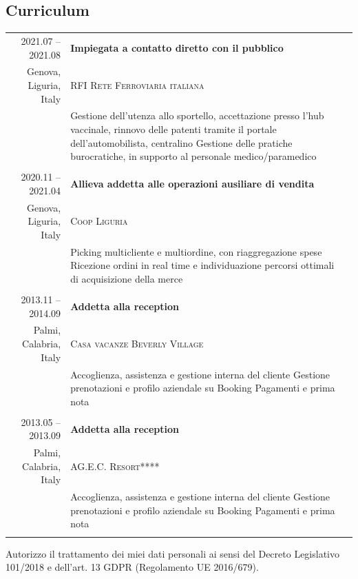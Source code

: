 \documentclass[11pt, a4paper]{article}
\newlength{\headerheight}
\newlength{\rightcolwidth}
\newcommand{\cvevent}[5]{
  \footnotesize{#1} & \textbf{#2} \\
  \footnotesize{#4 \color{cvred}\faMapMarker} & \footnotesize\textsc{#3} \\
  & \color{black!70}\footnotesize{#5}
}
\begin{document}
\begin{bgbox}[height=\paperheight-\headerheight,width=\rightcolwidth,colback=white]
  \vspace{1em}

  \section*{Curriculum}
  \begin{tabular}{r| p{} c}
    \cvevent{2021.07 -- 2021.08}{Impiegata a contatto diretto con il pubblico}{RFI Rete Ferroviaria italiana}{Genova, Liguria, Italy}{Gestione dell'utenza allo sportello, accettazione presso l'hub vaccinale, rinnovo delle patenti tramite il portale dell'automobilista, centralino \newline Gestione delle pratiche burocratiche, in supporto al personale medico/paramedico} \\ \\
    \cvevent{2020.11 -- 2021.04}{Allieva addetta alle operazioni ausiliare di vendita}{Coop Liguria}{Genova, Liguria, Italy}{Picking multicliente e multiordine, con riaggregazione spese \newline Ricezione ordini in real time e individuazione percorsi ottimali di acquisizione della merce} \\ \\
    \cvevent{2013.11 -- 2014.09}{Addetta alla reception}{Casa vacanze Beverly Village}{Palmi, Calabria, Italy}{Accoglienza, assistenza e gestione interna del cliente \newline Gestione prenotazioni e profilo aziendale su Booking \newline Pagamenti e prima nota} \\ \\
    \cvevent{2013.05 -- 2013.09}{Addetta alla reception}{AG.E.C. Resort****}{Palmi, Calabria, Italy}{Accoglienza, assistenza e gestione interna del cliente \newline Gestione prenotazioni e profilo aziendale su Booking \newline Pagamenti e prima nota} \\ \\
  \end{tabular}

  \vspace{1.5ex}
  \centering\tiny Autorizzo il trattamento dei miei dati personali ai sensi del Decreto Legislativo 101/2018 e dell'art. 13 GDPR (Regolamento UE 2016/679).
\end{bgbox}
\end{document}
